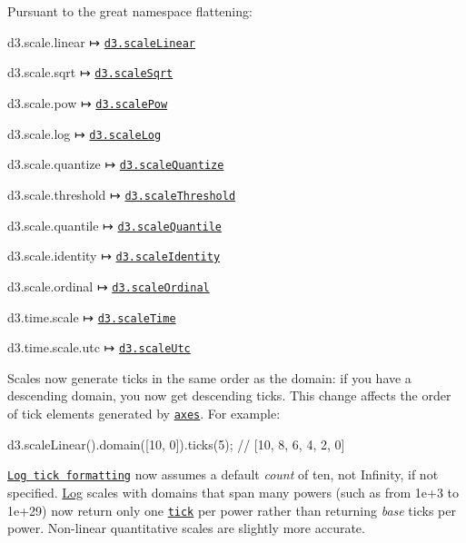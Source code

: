 Pursuant to the great namespace flattening\+:


\begin{DoxyItemize}
\item d3.\+scale.\+linear ↦ \href{https://github.com/d3/d3-scale/blob/master/README.md#scaleLinear}{\tt d3.\+scale\+Linear}
\item d3.\+scale.\+sqrt ↦ \href{https://github.com/d3/d3-scale/blob/master/README.md#scaleSqrt}{\tt d3.\+scale\+Sqrt}
\item d3.\+scale.\+pow ↦ \href{https://github.com/d3/d3-scale/blob/master/README.md#scalePow}{\tt d3.\+scale\+Pow}
\item d3.\+scale.\+log ↦ \href{https://github.com/d3/d3-scale/blob/master/README.md#scaleLog}{\tt d3.\+scale\+Log}
\item d3.\+scale.\+quantize ↦ \href{https://github.com/d3/d3-scale/blob/master/README.md#scaleQuantize}{\tt d3.\+scale\+Quantize}
\item d3.\+scale.\+threshold ↦ \href{https://github.com/d3/d3-scale/blob/master/README.md#scaleThreshold}{\tt d3.\+scale\+Threshold}
\item d3.\+scale.\+quantile ↦ \href{https://github.com/d3/d3-scale/blob/master/README.md#scaleQuantile}{\tt d3.\+scale\+Quantile}
\item d3.\+scale.\+identity ↦ \href{https://github.com/d3/d3-scale/blob/master/README.md#scaleIdentity}{\tt d3.\+scale\+Identity}
\item d3.\+scale.\+ordinal ↦ \href{https://github.com/d3/d3-scale/blob/master/README.md#scaleOrdinal}{\tt d3.\+scale\+Ordinal}
\item d3.\+time.\+scale ↦ \href{https://github.com/d3/d3-scale/blob/master/README.md#scaleTime}{\tt d3.\+scale\+Time}
\item d3.\+time.\+scale.\+utc ↦ \href{https://github.com/d3/d3-scale/blob/master/README.md#scaleUtc}{\tt d3.\+scale\+Utc}
\end{DoxyItemize}

Scales now generate ticks in the same order as the domain\+: if you have a descending domain, you now get descending ticks. This change affects the order of tick elements generated by \href{#axes-d3-axis}{\tt axes}. For example\+:


\begin{DoxyCode}
d3.scaleLinear().domain([10, 0]).ticks(5); // [10, 8, 6, 4, 2, 0]
\end{DoxyCode}


\href{https://github.com/d3/d3-scale/blob/master/README.md#log_tickFormat}{\tt Log tick formatting} now assumes a default {\itshape count} of ten, not Infinity, if not specified. \mbox{\hyperlink{classLog}{Log}} scales with domains that span many powers (such as from 1e+3 to 1e+29) now return only one \href{https://github.com/d3/d3-scale/blob/master/README.md#log_ticks}{\tt tick} per power rather than returning {\itshape base} ticks per power. Non-\/linear quantitative scales are slightly more accurate.

